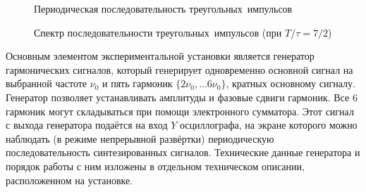 \begin{figure}[t]
\begin{minipage}{0.45\textwidth}
	\caption{Периодическая последовательность треугольных~импульсов}
\end{minipage}
\hfill
\begin{minipage}{0.45\textwidth}
	\caption{Спектр последовательности треугольных~импульсов
(при $T/\tau=7/2$)}
\end{minipage}
\end{figure}

\experiment
Основным элементом экспериментальной установки является генератор гармонических
сигналов, который генерирует одновременно основной сигнал на выбранной частоте
$\nu_0$ и пять гармоник $\{2\nu_0,\ldots 6\nu_0\}$, кратных основному сигналу.
Генератор позволяет устанавливать амплитуды и фазовые сдвиги гармоник.
Все 6 гармоник могут складываться при помощи электронного сумматора. Этот сигнал
с выхода генератора подаётся на вход $Y$ осциллографа, на экране которого
можно наблюдать (в режиме непрерывной развёртки) периодическую
последовательность синтезированных сигналов. Технические
данные генератора и порядок работы с ним изложены в отдельном техническом
описании, расположенном на установке.

